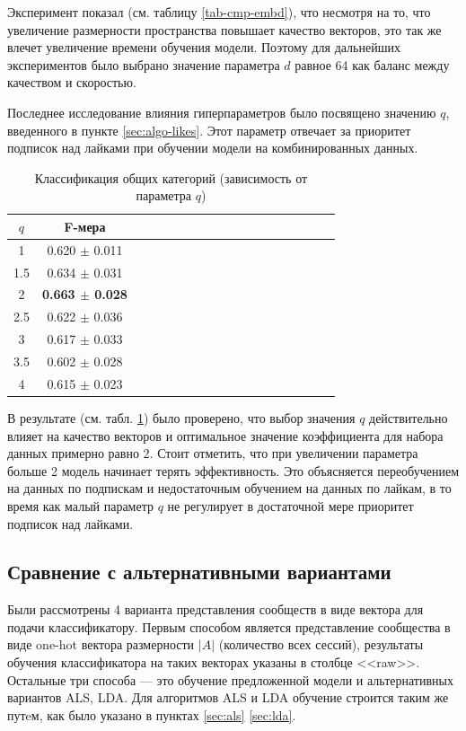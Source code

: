 \documentclass[times,specification,annotation]{itmo-student-thesis}
\begin{document}
Эксперимент показал (см. таблицу \ref{tab-cmp-embd}), что несмотря на то, что увеличение размерности пространства повышает качество векторов, это так же влечет увеличение времени обучения модели. Поэтому для дальнейших экспериментов было выбрано значение параметра $d$ равное 64 как баланс между качеством и скоростью.    

Последнее исследование влияния гиперпараметров было посвящено значению $q$, введенного в пункте \ref{sec:algo-likes}. Этот параметр отвечает за приоритет подписок над лайками при обучении модели на комбинированных данных. 

\begin{table}[!h]
\caption{Классификация общих категорий (зависимость от параметра $q$)}\label{tab-cmp-q}
\centering
\begin{tabular}{|*{18}{c|}}\hline
$q$ &  F-мера   \\\hline
1    & 0.620 $\pm$ 0.011 \\\hline
1.5 & 0.634 $\pm$ 0.031 \\\hline
2    & \textbf{0.663 $\pm$ 0.028} \\\hline
2.5 & 0.622 $\pm$ 0.036 \\\hline
3    & 0.617 $\pm$ 0.033 \\\hline
3.5 & 0.602 $\pm$ 0.028 \\\hline
4    & 0.615 $\pm$ 0.023 \\\hline
\end{tabular}
\end{table}

В результате (см. табл. \ref {tab-cmp-q}) было проверено, что выбор значения $q$ действительно влияет на качество векторов и оптимальное значение коэффициента для набора данных примерно равно 2. Стоит отметить, что при увеличении параметра больше 2 модель начинает терять эффективность. Это объясняется переобучением на данных по подпискам и недостаточным обучением на данных по лайкам, в то время как малый параметр $q$ не регулирует в достаточной мере приоритет подписок над лайками.  

\subsection{Сравнение с альтернативными вариантами}\label{class-alter}

Были рассмотрены 4 варианта представления сообществ в виде вектора для подачи классификатору. Первым способом является представление сообщества в виде one-hot вектора размерности $|A|$ (количество всех сессий), результаты обучения классификатора на таких векторах указаны в столбце <<raw>>. Остальные три способа --- это обучение предложенной модели и альтернативных вариантов ALS, LDA. Для алгоритмов ALS и LDA обучение строится таким же путeм, как было указано в пунктах \ref{sec:als} \ref{sec:lda}.  
\end{document}

